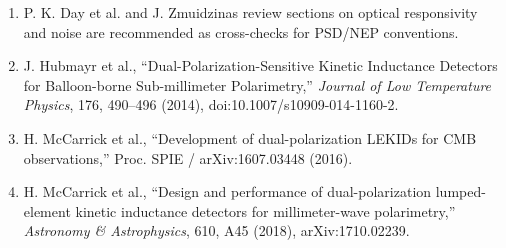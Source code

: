 \documentclass[11pt,a4paper,openany]{ctexrep}
\begin{document}
\begin{enumerate}
  \item P. K. Day et al. and J. Zmuidzinas review sections on optical responsivity and noise are recommended as cross-checks for PSD/NEP conventions.
  \item J. Hubmayr et al., ``Dual-Polarization-Sensitive Kinetic Inductance Detectors for Balloon-borne Sub-millimeter Polarimetry,'' \textit{Journal of Low Temperature Physics}, 176, 490--496 (2014), doi:10.1007/s10909-014-1160-2.
  \item H. McCarrick et al., ``Development of dual-polarization LEKIDs for CMB observations,'' Proc. SPIE / arXiv:1607.03448 (2016).
  \item H. McCarrick et al., ``Design and performance of dual-polarization lumped-element kinetic inductance detectors for millimeter-wave polarimetry,'' \textit{Astronomy \& Astrophysics}, 610, A45 (2018), arXiv:1710.02239.
\end{enumerate}
\end{document}
